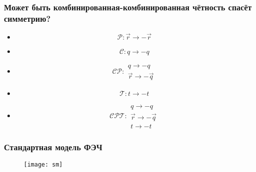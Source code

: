 \begin{frame}
    \frametitle{Может быть комбинированная-комбинированная чётность спасёт симметрию?}
    \begin{itemize}[<+->]
        \item
            \begin{equation*}
                \mathcal{P}: \vec{r} \to - \vec{r}
            \end{equation*}
        \item
            \begin{equation*}
                \mathcal{C}: q \to - q
            \end{equation*}
        \item
            \begin{equation*}
                \mathcal{CP}:
                \begin{array}{c}
                    q \to - q \\
                    \vec{r} \to - \vec{q}
                \end{array}
            \end{equation*}
        \item
            \begin{equation*}
                \mathcal{T}: t \to - t
            \end{equation*}
        \item
            \begin{equation*}
                \mathcal{CPT}:
                \begin{array}{c}
                    q \to - q \\
                    \vec{r} \to - \vec{q} \\
                    t \to - t
                \end{array}
            \end{equation*}
    \end{itemize}
\end{frame}

\begin{frame}
    \frametitle{Стандартная модель ФЭЧ}
    \begin{figure}
        \begin{centering}
            \texttt{[image: sm]}
        \end{centering}
    \end{figure}
\end{frame}
